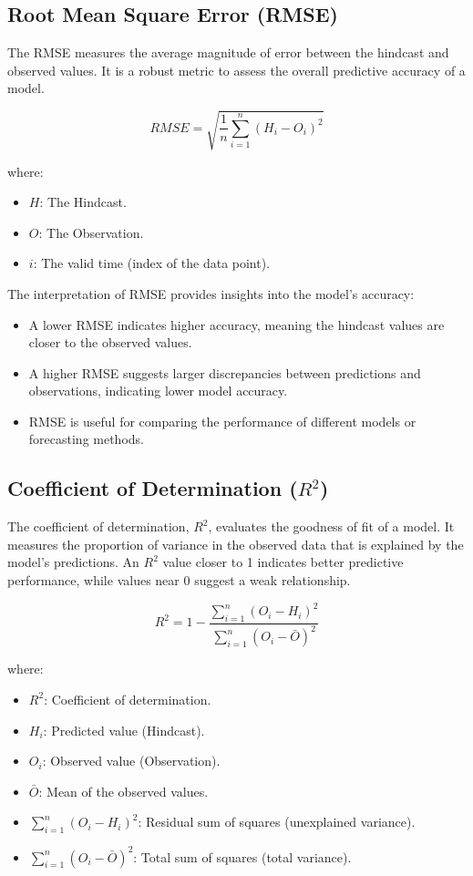 \subsection{Root Mean Square Error (RMSE)}

The RMSE measures the average magnitude of error between the hindcast and observed values. It is a robust metric to assess the overall predictive accuracy of a model. 

\[
RMSE = \sqrt{\frac{1}{n} \sum_{i=1}^{n}(H_i - O_i)^2}
\]

where:  
\begin{itemize}
    \item \( H \): The Hindcast.  
    \item \( O \): The Observation.  
    \item \( i \): The valid time (index of the data point).  
\end{itemize}


The interpretation of RMSE provides insights into the model's accuracy:  
\begin{itemize}
    \item A lower RMSE indicates higher accuracy, meaning the hindcast values are closer to the observed values.  
    \item A higher RMSE suggests larger discrepancies between predictions and observations, indicating lower model accuracy.  
    \item RMSE is useful for comparing the performance of different models or forecasting methods.  
\end{itemize}


\subsection{Coefficient of Determination (\( R^2 \))}
The coefficient of determination, \( R^2 \), evaluates the goodness of fit of a model. It measures the proportion of variance in the observed data that is explained by the model's predictions. An \( R^2 \) value closer to 1 indicates better predictive performance, while values near 0 suggest a weak relationship. 

\[
R^2 = 1 - \frac{\sum_{i=1}^n (O_i - H_i)^2}{\sum_{i=1}^n (O_i - \bar{O})^2}
\]

where:  
\begin{itemize}
    \item \( R^2 \): Coefficient of determination.  
    \item \( H_i \): Predicted value (Hindcast).  
    \item \( O_i \): Observed value (Observation).  
    \item \( \bar{O} \): Mean of the observed values.  
    \item \( \sum_{i=1}^n (O_i - H_i)^2 \): Residual sum of squares (unexplained variance).  
    \item \( \sum_{i=1}^n (O_i - \bar{O})^2 \): Total sum of squares (total variance).  
\end{itemize}

